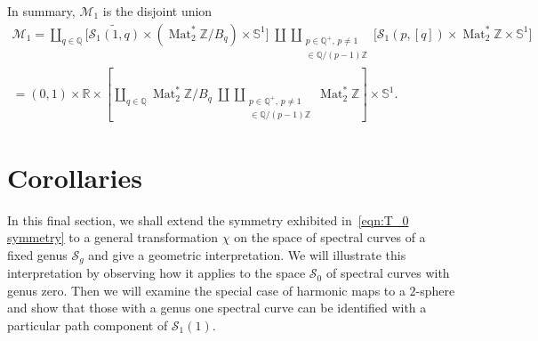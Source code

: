 \documentclass{article}
\numberwithin{equation}{section}
\numberwithin{figure}{section}
\newcommand{\bra}[1]{\left(#1\right)}
\DeclareMathOperator{\Mat}{Mat}
\newcommand{\Z}{\mathbb{Z}}
\newcommand{\Q}{\mathbb{Q}}
\newcommand{\R}{\mathbb{R}}
\renewcommand{\S}{\mathbb{S}}
\begin{document}
In summary, $\mathcal{M}_1$ is the disjoint union
\begin{gather*}
\mathcal{M}_1
=
\coprod_{q \in \Q} \Big[ \widetilde{\mathcal{S}_1(1,q)} \times \bra{\Mat_2^*\Z / B_q} \times \S^1 \Big]
\;\amalg
\coprod_{\substack{p \in \Q^+,\, p \neq 1\\ [q] \in \Q/(p-1)\Z}} \Big[ \mathcal{S}_1(p,[q]) \times \Mat_2^*\Z \times \S^1 \Big] \\
=
(0,1)\times\R \times \left[
\coprod_{q \in \Q} \Mat_2^*\Z / B_q
\;\amalg
\coprod_{\substack{p \in \Q^+,\, p \neq 1\\ [q] \in \Q/(p-1)\Z}} \Mat_2^*\Z
\right] \times \S^1.
\end{gather*}











\section{Corollaries}\label{sec:Corollaries}

In this final section, we shall extend the symmetry exhibited in~\eqref{eqn:T_0 symmetry} to a general transformation $\chi$ on the space of spectral curves of a fixed genus $\mathcal{S}_g$ and give a geometric interpretation. We will illustrate this interpretation by observing how it applies to the space $\mathcal{S}_0$ of spectral curves with genus zero. 
Then we will examine the special case of harmonic maps to a $2$-sphere and show that those with a genus one spectral curve can be identified with a particular path component of $\mathcal{S}_1(1)$.
\end{document}
